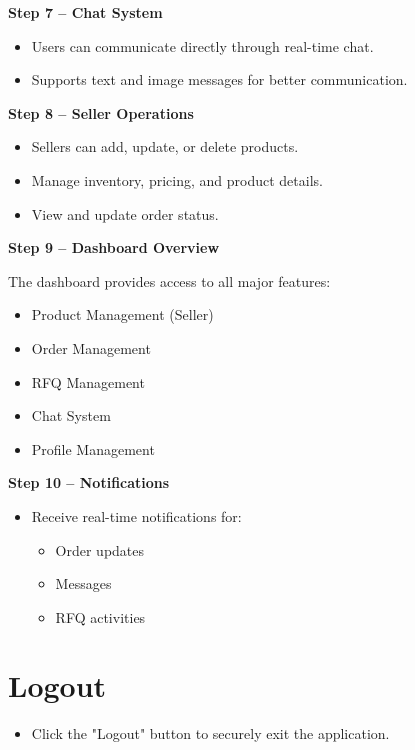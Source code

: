 \textbf{Step 7 – Chat System}

\begin{itemize}
    \item Users can communicate directly through real-time chat.
    \item Supports text and image messages for better communication.
\end{itemize}

\textbf{Step 8 – Seller Operations}

\begin{itemize}
    \item Sellers can add, update, or delete products.
    \item Manage inventory, pricing, and product details.
    \item View and update order status.
\end{itemize}

\textbf{Step 9 – Dashboard Overview}

The dashboard provides access to all major features:

\begin{itemize}
    \item Product Management (Seller)
    \item Order Management
    \item RFQ Management
    \item Chat System
    \item Profile Management
\end{itemize}

\textbf{Step 10 – Notifications}

\begin{itemize}
    \item Receive real-time notifications for:
    \begin{itemize}
        \item Order updates
        \item Messages
        \item RFQ activities
    \end{itemize}
\end{itemize}

\section{Logout}

\begin{itemize}
    \item Click the "Logout" button to securely exit the application.
\end{itemize}

